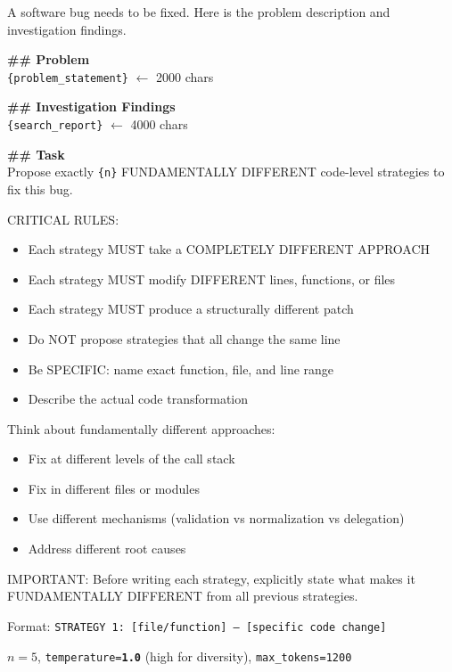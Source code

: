 \documentclass[10pt,a4paper,twocolumn]{article}
\begin{document}
\begin{promptbox}[title=Strategy Proposal Prompt]
\scriptsize
A software bug needs to be fixed. Here is the problem description and investigation findings.

\textbf{\#\# Problem}\\
\texttt{\{problem\_statement\}} {\color{gray}$\leftarrow$ 2000 chars}

\textbf{\#\# Investigation Findings}\\
\texttt{\{search\_report\}} {\color{gray}$\leftarrow$ 4000 chars}

\textbf{\#\# Task}\\
Propose exactly \texttt{\{n\}} FUNDAMENTALLY DIFFERENT code-level strategies to fix this bug.

CRITICAL RULES:
\begin{itemize}[nosep,leftmargin=8pt]
\item Each strategy MUST take a COMPLETELY DIFFERENT APPROACH
\item Each strategy MUST modify DIFFERENT lines, functions, or files
\item Each strategy MUST produce a structurally different patch
\item Do NOT propose strategies that all change the same line
\item Be SPECIFIC: name exact function, file, and line range
\item Describe the actual code transformation
\end{itemize}

Think about fundamentally different approaches:
\begin{itemize}[nosep,leftmargin=8pt]
\item Fix at different levels of the call stack
\item Fix in different files or modules
\item Use different mechanisms (validation vs normalization vs delegation)
\item Address different root causes
\end{itemize}

IMPORTANT: Before writing each strategy, explicitly state what makes it FUNDAMENTALLY DIFFERENT from all previous strategies.

Format: \texttt{STRATEGY 1: [file/function] --- [specific code change]}
\end{promptbox}

\begin{small}
$n=5$, \texttt{temperature=\textbf{1.0}} (high for diversity), \texttt{max\_tokens=1200}
\end{small}
\end{document}
